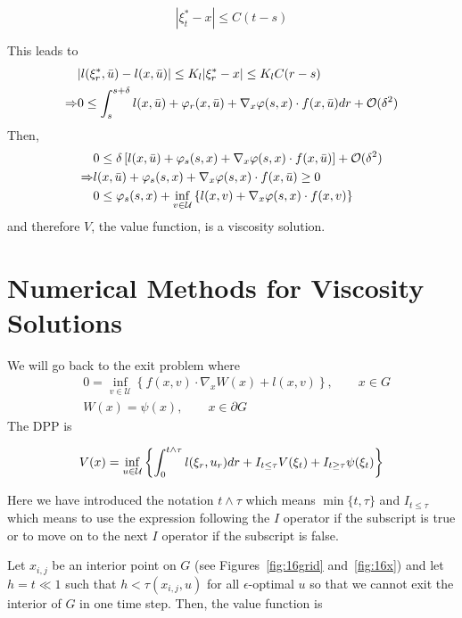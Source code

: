 \begin{equation*}
|\xi_t^\ast-x|\leq C(t-s)
\end{equation*}

This leads to
\begin{align*}
&|l(\xi_r^\ast,\bar{u}) - l(x,\bar{u})| \leq K_l|\xi_r^\ast-x| \leq K_l C(r-s) \\
\Rightarrow &0 \leq \int_s^{s+\delta}l(x,\bar{u})+\varphi_r(x,\bar{u})+\nabla_x\varphi(s,x)\cdot f(x,\bar{u})dr + \mathcal{O}(\delta^2)
\end{align*}
Then,
\begin{align*}
&0 \leq \delta\left[ l(x,\bar{u})+\varphi_s(s,x)+\nabla_x\varphi(s,x)\cdot f(x,\bar{u})\right] + \mathcal{O}(\delta^2) \\
\Rightarrow &l(x,\bar{u}) + \varphi_s(s,x) + \nabla_x\varphi(s,x)\cdot f(x,\bar{u}) \geq 0 \\
&0 \leq \varphi_s(s,x) + \inf_{v\in\mathcal{U}}\left\lbrace l(x,v) + \nabla_x\varphi(s,x)\cdot f(x,v)\right\rbrace \\
\end{align*}
and therefore $V$, the value function, is a viscosity solution.

\section{Numerical Methods for Viscosity Solutions}
We will go back to the exit problem where
\begin{align*}
&0 = \inf_{v\in\mathcal{U}}\left\lbrace f(x,v)\cdot\nabla_x W(x)+l(x,v)\right\rbrace, \qquad x\in G \\
&W(x) = \psi(x), \qquad x\in\partial G
\end{align*}
The DPP is

\begin{equation*}
V(x) = \inf_{u\in\mathcal{U}}\left\lbrace \int_0^{t\wedge\tau}l(\xi_r,u_r)dr + I_{t\leq\tau}V(\xi_t) + I_{t\geq\tau}\psi(\xi_t)\right\rbrace
\end{equation*}

Here we have introduced the notation $t\wedge\tau$ which means $\min\{t,\tau\}$ and $I_{t\leq\tau}$ which means to use the expression following the $I$ operator if the subscript is true or to move on to the next $I$ operator if the subscript is false.

Let $x_{i,j}$ be an interior point on $G$ (see Figures~\ref{fig:16grid} and~\ref{fig:16x}) and let $h=t\ll 1$ such that $h<\tau(x_{i,j},u)$ for all $\epsilon$-optimal $u$ so that we cannot exit the interior of $G$ in one time step.
Then, the value function is

